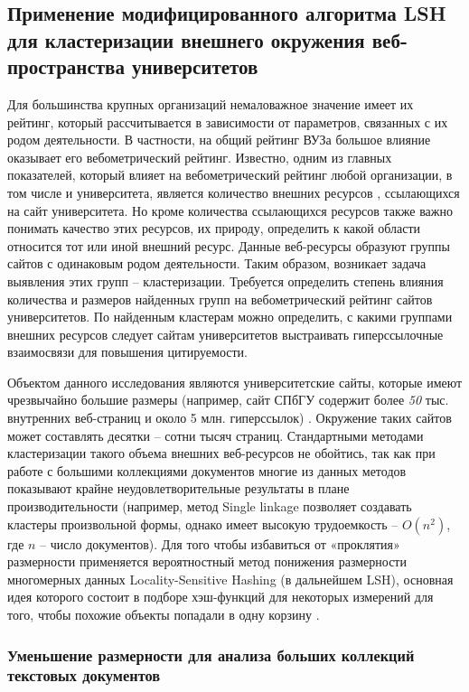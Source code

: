 \subsection{Применение модифицированного алгоритма LSH для кластеризации внешнего окружения веб-пространства университетов}\label{subsec:ch1/sec4/sub7}

Для большинства крупных организаций немаловажное значение имеет их рейтинг, который рассчитывается в зависимости от параметров, связанных с их родом деятельности. В частности, на общий рейтинг ВУЗа большое влияние оказывает его вебометрический рейтинг. Известно, одним из главных показателей, который влияет на вебометрический рейтинг любой организации, в том числе и университета, является количество внешних ресурсов \cite{RankingWeb}, ссылающихся на сайт университета. Но кроме количества ссылающихся ресурсов также важно понимать качество этих ресурсов, их природу, определить к какой области относится тот или иной внешний ресурс. Данные веб-ресурсы образуют группы сайтов с одинаковым родом деятельности. Таким образом, возникает задача выявления этих групп -- кластеризации. Требуется определить степень влияния количества и размеров найденных групп на вебометрический рейтинг сайтов университетов. По найденным кластерам можно определить, с какими группами внешних ресурсов следует сайтам университетов выстраивать гиперссылочные взаимосвязи для повышения цитируемости.

Объектом данного исследования являются университетские сайты, которые имеют чрезвычайно большие размеры (например, сайт СПбГУ содержит более \textit{50} тыс. внутренних веб-страниц и около 5 млн. гиперссылок) \cite{BlekanovMoskalets,BlekanovSergeevMaksimovBOWTIE}. Окружение таких сайтов может составлять десятки – сотни тысяч страниц. Стандартными методами кластеризации такого объема внешних веб-ресурсов не обойтись, так как при работе с большими коллекциями документов многие из данных методов показывают крайне неудовлетворительные результаты в плане производительности \cite{EneImMoseley} (например, метод Single linkage позволяет создавать кластеры произвольной формы, однако имеет высокую трудоемкость -- \(O(n^2)\), где \(n\) -- число документов). Для того чтобы избавиться от «проклятия» размерности применяется вероятностный метод понижения размерности многомерных данных Locality-Sensitive Hashing (в дальнейшем LSH), основная идея которого состоит в подборе хэш-функций для некоторых измерений для того, чтобы похожие объекты попадали в одну корзину \cite{Buhler}.

\subsubsection{Уменьшение размерности для анализа больших коллекций текстовых документов}

